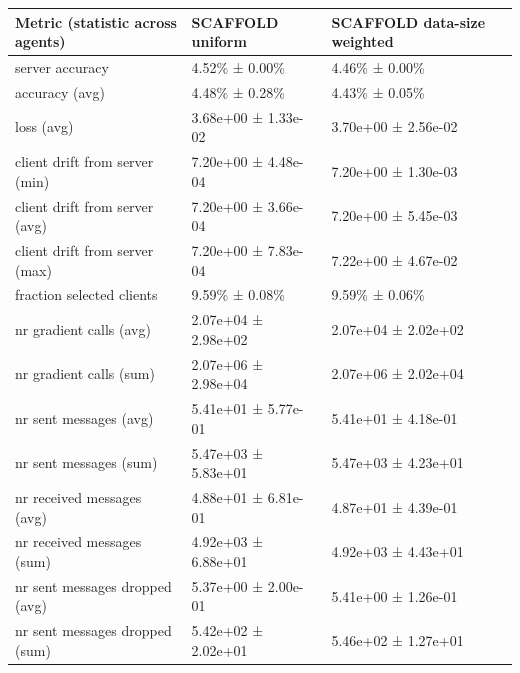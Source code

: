 \begin{tabular}{lll}
\hline
 Metric (statistic across agents)   & SCAFFOLD uniform    & SCAFFOLD data-size weighted   \\
\hline
 server accuracy                    & 4.52\% ± 0.00\%       & 4.46\% ± 0.00\%                 \\
 accuracy (avg)                     & 4.48\% ± 0.28\%       & 4.43\% ± 0.05\%                 \\
 loss (avg)                         & 3.68e+00 ± 1.33e-02 & 3.70e+00 ± 2.56e-02           \\
 client drift from server (min)     & 7.20e+00 ± 4.48e-04 & 7.20e+00 ± 1.30e-03           \\
 client drift from server (avg)     & 7.20e+00 ± 3.66e-04 & 7.20e+00 ± 5.45e-03           \\
 client drift from server (max)     & 7.20e+00 ± 7.83e-04 & 7.22e+00 ± 4.67e-02           \\
 fraction selected clients          & 9.59\% ± 0.08\%       & 9.59\% ± 0.06\%                 \\
 nr gradient calls (avg)            & 2.07e+04 ± 2.98e+02 & 2.07e+04 ± 2.02e+02           \\
 nr gradient calls (sum)            & 2.07e+06 ± 2.98e+04 & 2.07e+06 ± 2.02e+04           \\
 nr sent messages (avg)             & 5.41e+01 ± 5.77e-01 & 5.41e+01 ± 4.18e-01           \\
 nr sent messages (sum)             & 5.47e+03 ± 5.83e+01 & 5.47e+03 ± 4.23e+01           \\
 nr received messages (avg)         & 4.88e+01 ± 6.81e-01 & 4.87e+01 ± 4.39e-01           \\
 nr received messages (sum)         & 4.92e+03 ± 6.88e+01 & 4.92e+03 ± 4.43e+01           \\
 nr sent messages dropped (avg)     & 5.37e+00 ± 2.00e-01 & 5.41e+00 ± 1.26e-01           \\
 nr sent messages dropped (sum)     & 5.42e+02 ± 2.02e+01 & 5.46e+02 ± 1.27e+01           \\
\hline
\end{tabular}